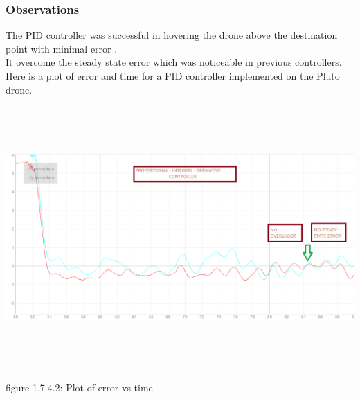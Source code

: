 \documentclass[a4paper,12pt,oneside]{book}
\begin{document}
\subsubsection{\textbf{Observations}}
The PID controller was successful in hovering the drone above the destination point with minimal error .\\
It overcome the steady state error which was noticeable in previous controllers.
Here is a plot of error and time for a PID controller implemented on the Pluto drone.
\begin{flushleft}
\includegraphics[width = 15cm , height= 10cm]{pid-1-no-z.png}
\end{flushleft}
\begin{center}
    figure 1.7.4.2: Plot of error vs time 
\end{center}
 
\end{document}
